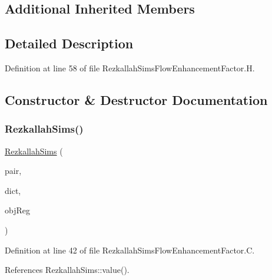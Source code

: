 \subsection*{Additional Inherited Members}


\subsection{Detailed Description}


Definition at line 58 of file Rezkallah\+Sims\+Flow\+Enhancement\+Factor.\+H.



\subsection{Constructor \& Destructor Documentation}
\mbox{\label{classFoam_1_1flowEnhancementFactorModels_1_1RezkallahSims_a3739966bba5a252b943ef9ff2d00d74c}} 
\subsubsection{\texorpdfstring{Rezkallah\+Sims()}{RezkallahSims()}}
{\footnotesize\ttfamily \hyperlink{classFoam_1_1flowEnhancementFactorModels_1_1RezkallahSims}{Rezkallah\+Sims} (\begin{DoxyParamCaption}\item[{const \hyperlink{classFoam_1_1FSPair}{F\+S\+Pair} \&}]{pair,  }\item[{const dictionary \&}]{dict,  }\item[{const object\+Registry \&}]{obj\+Reg }\end{DoxyParamCaption})}



Definition at line 42 of file Rezkallah\+Sims\+Flow\+Enhancement\+Factor.\+C.



References Rezkallah\+Sims\+::value().

